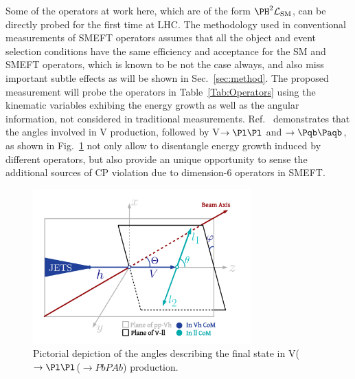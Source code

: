 \documentclass[a4paper,11pt]{article}
\newcommand{\Pb}{{{\Pqb}}\xspace}
\newcommand{\PAb}{{{{\Paqb}}}\xspace}
\renewcommand{\PV}{{{{V}}}\xspace}
\newcommand{\VH}{{{\PV}{\PH}}\xspace}
\begin{document}
Some of the operators at work here, which are of the form ${\PH}^2\mathcal{L}_{\text{SM}}$, can be directly probed for the first time at LHC.
The methodology used in conventional measurements of SMEFT operators assumes that all the object and event selection conditions have the same efficiency and acceptance for the SM and SMEFT operators, 
which is known to be not the case always, and also miss important subtle effects as will be shown in Sec.~\ref{sec:method}.
The proposed measurement will probe the operators in Table~\ref{Tab:Operators} 
using the kinematic variables exhibing the energy growth as well as the angular information, not considered in traditional measurements. 
Ref.~\cite{Banerjee:2019twi} demonstrates that the angles involved in \VH production, followed by \PV$\to \Pl \Pl $ and \PH$\to \Pb \PAb$, as  shown in Fig.~\ref{fig:HelicityFrame} 
not only allow to disentangle energy growth induced by different operators, 
but also provide an unique opportunity to sense the additional sources of CP violation due to dimension-6 operators in SMEFT.
\begin{figure}[hbtp]
\begin{center}
\includegraphics[width=0.75\textwidth]{Figures/LHE/TheThreeAnglesVh.pdf}
\end{center}
\caption{
Pictorial depiction of the angles describing the final state in \PV($\to \Pl \Pl$\PH($\to Pb PAb$) production.
}
\label{fig:HelicityFrame}
\end{figure}

\end{document}
